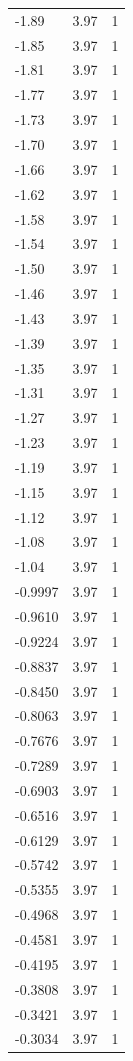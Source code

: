 \begin{longtable}{lrr}
  -1.89 & 3.97 & 1 \\
  -1.85 & 3.97 & 1 \\
  -1.81 & 3.97 & 1 \\
  -1.77 & 3.97 & 1 \\
  -1.73 & 3.97 & 1 \\
  -1.70 & 3.97 & 1 \\
  -1.66 & 3.97 & 1 \\
  -1.62 & 3.97 & 1 \\
  -1.58 & 3.97 & 1 \\
  -1.54 & 3.97 & 1 \\
  -1.50 & 3.97 & 1 \\
  -1.46 & 3.97 & 1 \\
  -1.43 & 3.97 & 1 \\
  -1.39 & 3.97 & 1 \\
  -1.35 & 3.97 & 1 \\
  -1.31 & 3.97 & 1 \\
  -1.27 & 3.97 & 1 \\
  -1.23 & 3.97 & 1 \\
  -1.19 & 3.97 & 1 \\
  -1.15 & 3.97 & 1 \\
  -1.12 & 3.97 & 1 \\
  -1.08 & 3.97 & 1 \\
  -1.04 & 3.97 & 1 \\
  -0.9997 & 3.97 & 1 \\
  -0.9610 & 3.97 & 1 \\
  -0.9224 & 3.97 & 1 \\
  -0.8837 & 3.97 & 1 \\
  -0.8450 & 3.97 & 1 \\
  -0.8063 & 3.97 & 1 \\
  -0.7676 & 3.97 & 1 \\
  -0.7289 & 3.97 & 1 \\
  -0.6903 & 3.97 & 1 \\
  -0.6516 & 3.97 & 1 \\
  -0.6129 & 3.97 & 1 \\
  -0.5742 & 3.97 & 1 \\
  -0.5355 & 3.97 & 1 \\
  -0.4968 & 3.97 & 1 \\
  -0.4581 & 3.97 & 1 \\
  -0.4195 & 3.97 & 1 \\
  -0.3808 & 3.97 & 1 \\
  -0.3421 & 3.97 & 1 \\
  -0.3034 & 3.97 & 1 \\

\end{longtable}
